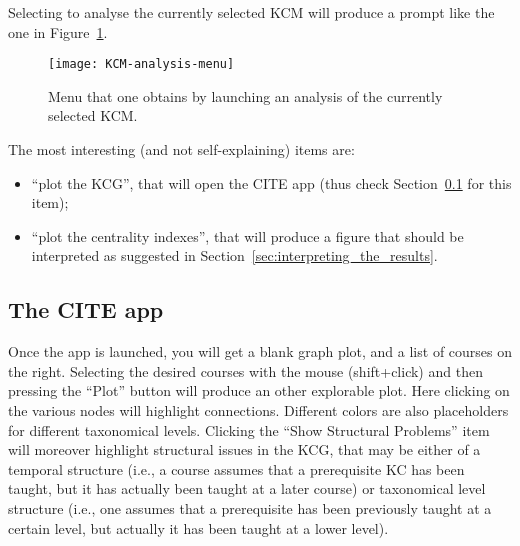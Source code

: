 Selecting to analyse the currently selected KCM will produce a prompt like the one in Figure~\ref{fig:KCM-analysis-menu}.

\begin{figure}[!htbp]
	\centering
	\texttt{[image: KCM-analysis-menu]}
	\caption{Menu that one obtains by launching an analysis of the currently selected KCM.}
	\label{fig:KCM-analysis-menu}
\end{figure}

The most interesting (and not self-explaining) items are:
%
\begin{itemize}
	\item ``plot the KCG'', that will open the CITE app (thus check Section~\ref{ssec:the_cite_app} for this item);
	\item ``plot the centrality indexes'', that will produce a figure that should be interpreted as suggested in Section~\ref{sec:interpreting_the_results}.
\end{itemize}

\subsection{The CITE app}
\label{ssec:the_cite_app}

Once the app is launched, you will get a blank graph plot, and a list of courses on the right. Selecting the desired courses with the mouse (shift+click) and then pressing the ``Plot'' button will produce an other explorable plot. Here clicking on the various nodes will highlight connections. Different colors are also placeholders for different taxonomical levels. Clicking the ``Show Structural Problems'' item will moreover highlight structural issues in the \ac{KCG}, that may be either of a temporal structure (i.e., a course assumes that a prerequisite \ac{KC} has been taught, but it has actually been taught at a later course) or taxonomical level structure (i.e., one assumes that a prerequisite has been previously taught at a certain level, but actually it has been taught at a lower level).


